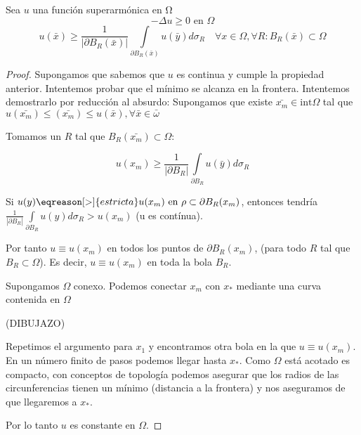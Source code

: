 		\begin{theorem} Sea $u$ una función superarmónica en Ω
			\[ - \Delta u \geq 0 \text{ en } \Omega \]
			\[ u (\bar{x}) \geq \frac{1}{|\partial B_R(\bar{x})|} \int\limits_{\partial B_R (\bar{x})} u(\bar{y}) d \sigma_R \quad \forall x \in \Omega, \forall R : B_R(\bar{x}) \subset \Omega \]

		\end{theorem}

		\begin{proof}

			Supongamos que sabemos que $u$ es continua y cumple la propiedad anterior. Intentemos probar que el mínimo se alcanza en la frontera. Intentemos demostrarlo por reducción al absurdo: Supongamos que existe $\bar{x_m} \in \text{int} \Omega$ tal que $u(\bar{x_m}) \leq (\bar{x_m}) \leq u(\bar{x}), \forall \bar{x} \in \bar{\omega}$

			Tomamos un $R$ tal que $B_R (\bar{x_m}) \subset \Omega$:

			\[ u(x_m) \geq \frac{1}{|\partial B_R|}  \int\limits_{\partial B_R} u(\bar{y}) d \sigma_R \]

			Si $u(y) \eqreason[>]{estricta} u(x_m) \text{ en } \rho \subset \partial B_R (x_m)$, entonces tendría $\frac{1}{|\partial B_R|} \int\limits_{\partial B_R} u(y) d \sigma_R > u(x_m) $ (u es contínua).

			Por tanto $u \equiv u(x_m)$ en todos los puntos de $\partial B_R(x_m)$, (para todo $R$ tal que $B_R \subset \Omega$). Es decir, $u \equiv u(x_m)$ en toda la bola $B_R$.

			Supongamos $\Omega$ conexo. Podemos conectar $x_m$ con $x_*$ mediante una curva contenida en $\Omega$

			(DIBUJAZO)

			Repetimos el argumento para $x_1$ y encontramos otra bola en la que $u \equiv u(x_m)$. En un número finito de pasos podemos llegar hasta $x_*$. Como $\Omega$ está acotado es compacto, con conceptos de topología podemos asegurar que los radios de las circunferencias tienen un mínimo (distancia a la frontera) y nos aseguramos de que llegaremos a $x_*$.

			Por lo tanto $u$ es constante en $\Omega$.

		\end{proof}

